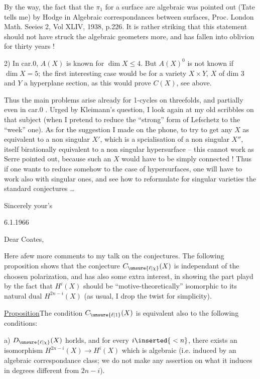 

By the way, the fact that the $\pi_1$ for a surface are algebraic was pointed out (Tate tells me) by Hodge in Algebraic correspondances between surfaces, Proc. London Math.  Seeies 2, Vol XLIV, 1938, p.226. It is rather striking that this statement should not have struck the algebraic geometers more, and has fallen into oblivion for  thirty years !

2) In car.0, $A(X)$ is known for $\dim X\leq4$. But $A(X)^0$ is not known if $\dim X=5$; the first interesting case would be for a variety $X\times Y$, $X$ of dim 3 and $Y$ a hyperplane section, as this would prove $C(X)$, see above.

Thus the main problems arise already for 1-cycles on threefolds, and partially even in car.0 . Urged by Kleimann's question, I  look again at my old scribbles on that subject (when I pretend to reduce the ``strong'' form of Lefschetz to the ``week'' one). As for the suggestion I made on the phone, to try to get any $X$ as  equivalent to a non singular $X'$, which is a spcialisation of a non singular $X''$, itself birationally equivalent to a non singular hypersurface -- this cannot work as Serre pointed out, because such an $X$ would have to be simply connected ! Thus if one wants to reduce somehow to the case of hypersurfaces, one will have to work also with singular ones, and see how to reformulate for singular varieties the standard conjectures \ldots

Sincerely your's



6.1.1966

Dear Coates,

Here a\inserted{\ }few more comments to my talk on the conjectures. The following proposition shows that the conjecture $C_{\unsure{\ell|\chi}}(X)$ is independant of the choosen polarization, and has also some extra interest, in showing the part playd by the fact that $H^i(X)$ should be ``motive-theoretically'' isomorphic to its natural dual $H^{2n-i}(X)$ (as usual, I drop the twist for simplicity).

\uline{Proposition}\quad The condition $C_{\unsure{\ell|1}}(X)$ is equivalent also to  the following conditions:

a) $D_{\unsure{\ell|\chi}}(X)$ horlds, and for every $i\inserted{{}<n}$, there exists an isomorphism $H^{2n-i}(X)\to H^i(X)$ which is algebraic (i.e. induced by an algebraic correspondance class; we do not make any assertion on what it induces in degrees different from $2n-i$).

